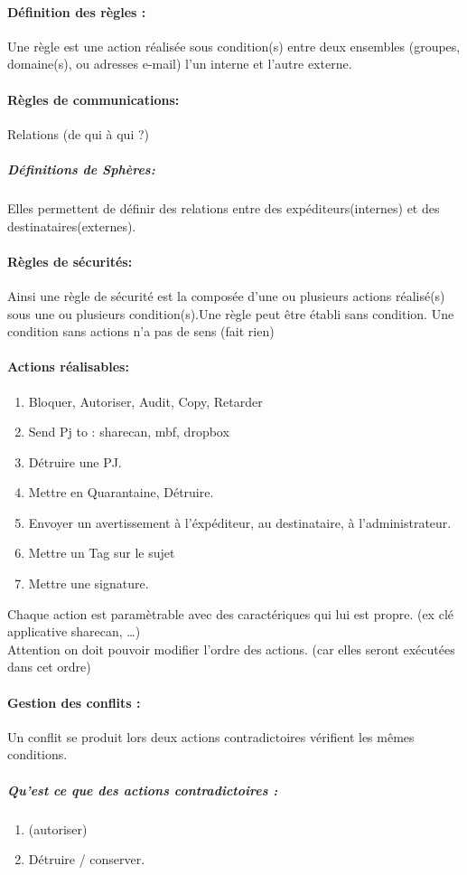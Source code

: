 \paragraph{Définition des règles :}
Une règle est une action réalisée sous condition(s) entre deux ensembles (groupes, domaine(s), ou adresses e-mail) l'un interne et l'autre externe. 
\paragraph{Règles de communications:}Relations (de qui à qui ?)
\subparagraph{Définitions de Sphères:} Elles permettent de définir des relations entre des expéditeurs(internes) et des destinataires(externes).
\paragraph{Règles de sécurités: } Ainsi une règle de sécurité est la composée d'une ou plusieurs actions réalisé(s) sous une ou plusieurs condition(s).Une règle peut être établi sans condition. Une condition sans actions n'a pas de sens (fait rien)

\paragraph{Actions réalisables:}
\begin{enumerate}
\item Bloquer, Autoriser, Audit, Copy, Retarder
\item Send Pj to : sharecan, mbf, dropbox
\item Détruire une PJ.
\item Mettre en Quarantaine, Détruire.
\item Envoyer un avertissement à l'éxpéditeur, au destinataire, à l'administrateur.
\item Mettre un Tag sur le sujet
\item Mettre une signature.
\end{enumerate} 
Chaque action est paramètrable avec des caractériques qui lui est propre. (ex clé applicative sharecan, …)\\
Attention on doit pouvoir modifier l'ordre des actions. (car elles seront exécutées dans cet ordre)

\paragraph{Gestion des conflits :} 
Un conflit se produit lors deux actions contradictoires vérifient les mêmes conditions.
\subparagraph{Qu’est ce que des actions contradictoires :}
\begin{enumerate}
 \item (autoriser)
 \item Détruire / conserver.
\end{enumerate}

